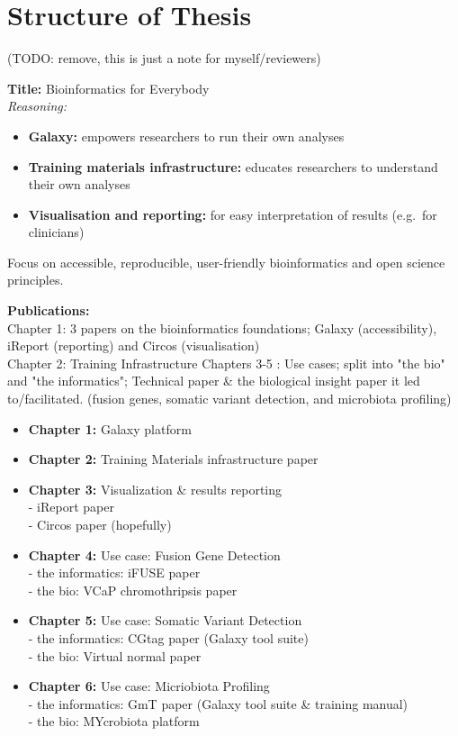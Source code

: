 \chapter*{Structure of Thesis}
\vspace{-2cm}
(TODO: remove, this is just a note for myself/reviewers)


\textbf{Title: } Bioinformatics for Everybody \\
\textit{Reasoning: }\vspace{-1.8em}
\begin{itemize}
\itemsep-0.5em
  \item \textbf{Galaxy:} empowers researchers to run their own analyses
  \item \textbf{Training materials infrastructure:} educates researchers to understand their own analyses
  \item \textbf{Visualisation and reporting:} for easy interpretation of results (e.g.\ for clinicians)
\end{itemize}
\vspace{-1.8em}
Focus on accessible, reproducible, user-friendly bioinformatics and open science principles.


\textbf{Publications:} \\

Chapter 1: 3 papers on the bioinformatics foundations; Galaxy (accessibility), iReport (reporting) and Circos (visualisation) \\
Chapter 2: Training Infrastructure
Chapters 3-5 : Use cases; split into "the bio" and "the informatics"; Technical paper \& the biological insight paper it led to/facilitated. (fusion genes, somatic variant detection, and microbiota profiling) \\

\begin{itemize}
\itemsep-0.5em
\item \textbf{Chapter 1:} Galaxy platform \\
\item \textbf{Chapter 2:} Training Materials infrastructure paper \\
\item \textbf{Chapter 3:} Visualization \& results reporting \\
  - iReport paper \\
  - Circos paper (hopefully)
\item \textbf{Chapter 4:} Use case: Fusion Gene Detection \\
  - the informatics: iFUSE paper \\
  - the bio: VCaP chromothripsis paper
\item \textbf{Chapter 5:} Use case: Somatic Variant Detection \\
  - the informatics: CGtag paper (Galaxy tool suite) \\
  - the bio: Virtual normal paper
\item \textbf{Chapter 6:} Use case: Micriobiota Profiling \\
  - the informatics: GmT paper (Galaxy tool suite \& training manual) \\
  - the bio: MYcrobiota platform
\end{itemize}


